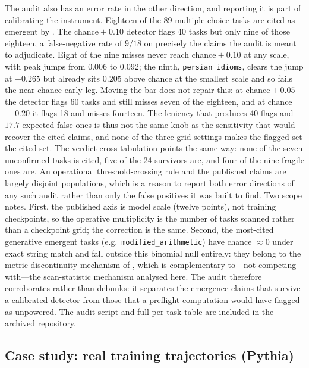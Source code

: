 \documentclass[11pt]{article}
\theoremstyle{plain}
\theoremstyle{definition}
\begin{document}
The audit also has an error rate in the other direction, and reporting it is part of
calibrating the instrument. Eighteen of the 89 multiple-choice tasks are cited as emergent
by \citet{wei2022emergent}. The chance${}+0.10$ detector flags 40 tasks but only nine of
those eighteen, a false-negative rate of $9/18$ on precisely the claims the audit is meant
to adjudicate. Eight of the nine misses never reach chance${}+0.10$ at any scale, with peak
jumps from $0.006$ to $0.092$; the ninth, \texttt{persian\_idioms}, clears the jump at
$+0.265$ but already sits $0.205$ above chance at the smallest scale and so fails the
near-chance-early leg. Moving the bar does not repair this: at chance${}+0.05$ the detector
flags 60 tasks and still misses seven of the eighteen, and at chance${}+0.20$ it flags 18
and misses fourteen. The leniency that produces 40 flags and $17.7$ expected false ones is
thus not the same knob as the sensitivity that would recover the cited claims, and none of
the three grid settings makes the flagged set the cited set. The verdict cross-tabulation
points the same way: none of the seven unconfirmed tasks is cited, five of the 24 survivors
are, and four of the nine fragile ones are. An operational threshold-crossing rule and the
published claims are largely disjoint populations, which is a reason to report both error
directions of any such audit rather than only the false positives it was built to find.
Two scope notes.
First, the published axis is model scale (twelve points), not training checkpoints, so
the operative multiplicity is the number of tasks scanned rather than a checkpoint grid;
the correction is the same. Second, the most-cited generative emergent tasks
(e.g.\ \texttt{modified\_arithmetic}) have chance ${\approx}0$ under exact string match
and fall outside this binomial null entirely: they belong to the metric-discontinuity
mechanism of \citet{schaeffer2023mirage}, which is complementary to---not competing
with---the scan-statistic mechanism analysed here. The audit therefore corroborates
rather than debunks: it separates the emergence claims that survive a calibrated
detector from those that a preflight computation would have flagged as unpowered. The
audit script and full per-task table are included in the archived repository.

\subsection{Case study: real training trajectories (Pythia)}\label{sec:pythia}
\end{document}
